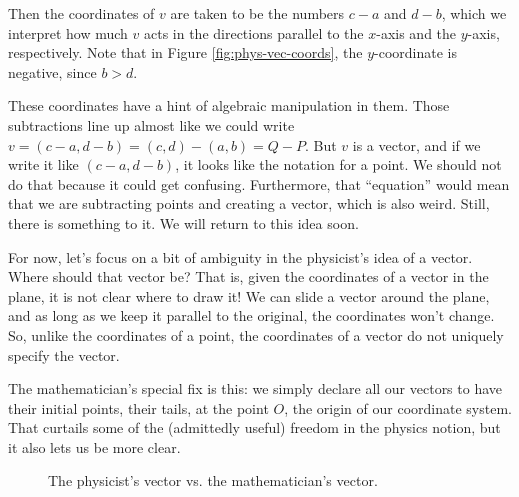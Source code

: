 \documentclass[elementsmain.tex]{subfiles}
\begin{document}
Then the coordinates of $v$ are taken to be the numbers $c-a$ and  $d-b$, which we interpret how much $v$ acts in the directions parallel to the $x$-axis and the $y$-axis, respectively.
Note that in Figure \ref{fig:phys-vec-coords}, the $y$-coordinate is negative, since $b>d$.

These coordinates have a hint of algebraic manipulation in them.
Those subtractions line up almost like we could write $v =(c-a,d-b) = (c,d)-(a,b) = Q-P$.
But $v$ is a vector, and if we write it like $(c-a,d-b)$, it looks like the notation for a point.
We should not do that because it could get confusing.
Furthermore, that ``equation'' would mean that we are subtracting points and creating a vector, which is also weird.
Still, there is something to it.
We will return to this idea soon.

For now, let's focus on a bit of ambiguity in the physicist's idea of a vector.
Where should that vector be?
That is, given the coordinates of a vector in the plane, it is not clear where to draw it!
We can slide a vector around the plane, and as long as we keep it parallel to the original, the coordinates won't change.
So, unlike the coordinates of a point, the coordinates of a vector do not uniquely specify the vector.

The mathematician's special fix is this: we simply declare all our vectors to have their initial points, their tails, at the point $O$, the origin of our coordinate system.
That curtails some of the (admittedly useful) freedom in the physics notion, but it also lets us be more clear.

\begin{figure}[h]
\centering
{}
\caption{The physicist's vector vs. the mathematician's vector.}
\end{figure}
\end{document}
